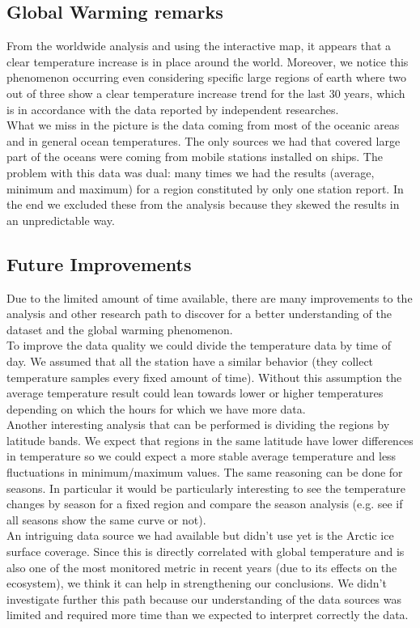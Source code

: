 \documentclass{vldb}
\begin{document}
\subsection{Global Warming remarks}
From the worldwide analysis and using the interactive map, it appears that a clear temperature increase is in place around the world. Moreover, we notice this phenomenon occurring even considering specific large regions of earth where two out of three show a clear temperature increase trend for the last 30 years, which is in accordance with the data reported by independent researches\cite{hansen2006global}. \\
What we miss in the picture is the data coming from most of the oceanic areas and in general ocean temperatures. The only sources we had that covered large part of the oceans were coming from mobile stations installed on ships. The problem with this data was dual: many times we had the results (average, minimum and maximum) for a region constituted by only one station report. In the end we excluded these from the analysis because they skewed the results in an unpredictable way.


\subsection{Future Improvements}
Due to the limited amount of time available, there are many improvements to the analysis and other research path to discover for a better understanding of the dataset and the global warming phenomenon. \\
To improve the data quality we could divide the temperature data by time of day. We assumed that all the station have a similar behavior (they collect temperature samples every fixed amount of time). Without this assumption the average temperature result could lean towards lower or higher temperatures depending on which the hours for which we have more data.\\
Another interesting analysis that can be performed is dividing the regions by latitude bands. We expect that regions in the same latitude have lower differences in temperature so we could expect a more stable average temperature and less fluctuations in minimum/maximum values. The same reasoning can be done for seasons. In particular it would be particularly interesting to see the temperature changes by season for a fixed region and compare the season analysis (e.g. see if all seasons show the same curve or not).\\
An intriguing data source we had available but didn't use yet is the Arctic ice surface coverage. Since this is directly correlated with global temperature and is also one of the most monitored metric in recent years (due to its effects on the ecosystem), we think it can help in strengthening our conclusions. We didn't investigate further this path because our understanding of the data sources was limited and required more time than we expected to interpret correctly the data.
\end{document}
